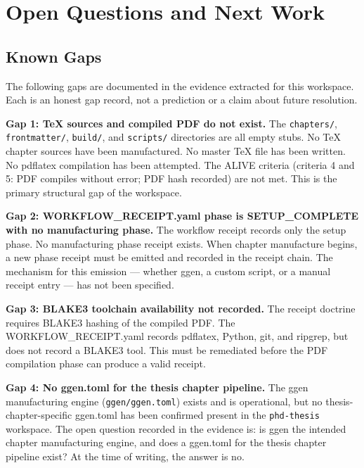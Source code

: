 
\section{Open Questions and Next Work}
\label{sec:phd-thesis-open}

\subsection{Known Gaps}
\label{sec:phd-thesis-open-gaps}

The following gaps are documented in the evidence extracted for this workspace. Each is an
honest gap record, not a prediction or a claim about future resolution.

\textbf{Gap 1: TeX sources and compiled PDF do not exist.}
The \texttt{chapters/}, \texttt{frontmatter/}, \texttt{build/}, and \texttt{scripts/}
directories are all empty stubs. No TeX chapter sources have been manufactured. No master
TeX file has been written. No pdflatex compilation has been attempted. The ALIVE criteria
(criteria 4 and 5: PDF compiles without error; PDF hash recorded) are not met. This is the
primary structural gap of the workspace.

\textbf{Gap 2: WORKFLOW\_RECEIPT.yaml phase is SETUP\_COMPLETE with no manufacturing phase.}
The workflow receipt records only the setup phase. No manufacturing phase receipt exists.
When chapter manufacture begins, a new phase receipt must be emitted and recorded in the
receipt chain. The mechanism for this emission --- whether ggen, a custom script, or a
manual receipt entry --- has not been specified.

\textbf{Gap 3: BLAKE3 toolchain availability not recorded.}
The receipt doctrine requires BLAKE3 hashing of the compiled PDF. The WORKFLOW\_RECEIPT.yaml
records pdflatex, Python, git, and ripgrep, but does not record a BLAKE3 tool. This must be
remediated before the PDF compilation phase can produce a valid receipt.

\textbf{Gap 4: No ggen.toml for the thesis chapter pipeline.}
The ggen manufacturing engine (\texttt{ggen/ggen.toml}) exists and is operational, but no
thesis-chapter-specific ggen.toml has been confirmed present in the \texttt{phd-thesis}
workspace. The open question recorded in the evidence is: is ggen the intended chapter
manufacturing engine, and does a ggen.toml for the thesis chapter pipeline exist? At the
time of writing, the answer is no.

